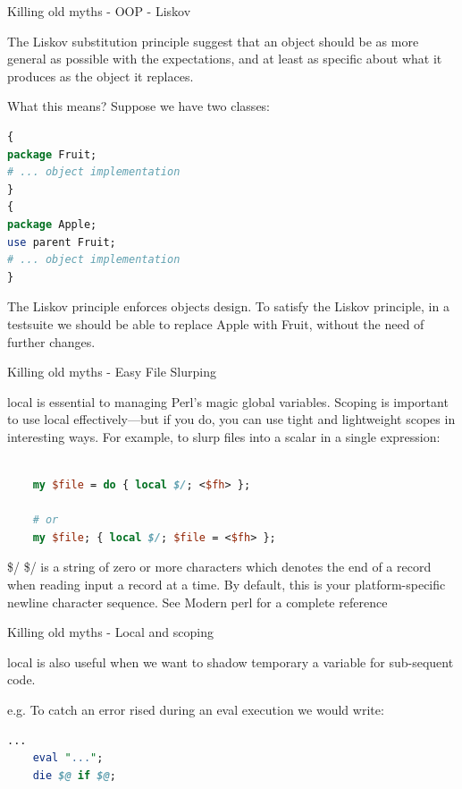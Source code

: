\documentclass[10pt]{beamer}
\begin{document}
\begin{frame}[fragile]{Killing old myths - OOP - Liskov}

The Liskov substitution principle suggest that an object should be as more general as possible with the expectations, and at least as specific about what it produces as the object it replaces.

What this means?
Suppose we have two classes:
\begin{lstlisting}[language=perl]
{
package Fruit;
# ... object implementation
}
{
package Apple;
use parent Fruit;
# ... object implementation
}
\end{lstlisting}
The Liskov principle enforces objects design. To satisfy the Liskov principle, in a testsuite we should be able to replace Apple with Fruit, without the need of further changes.

\end{frame}


\begin{frame}[fragile]{Killing old myths - Easy File Slurping}

local is essential to managing Perl's magic global variables. Scoping is important to use local effectively—but if you do, you can use tight and lightweight scopes in interesting ways. For example, to slurp files into a scalar in a single expression:
\begin{lstlisting}[language=perl]

    my $file = do { local $/; <$fh> };

    # or
    my $file; { local $/; $file = <$fh> };

    \end{lstlisting}

    \begin{alertblock}{\$/}
    \$/ is a string of zero or more characters which denotes the end of a record when reading input a record at a time. By default, this is your platform-specific newline character sequence. See Modern perl for a complete reference
    \end{alertblock}

\end{frame}

\begin{frame}[fragile]{Killing old myths - Local and scoping}

local is also useful when we want to shadow temporary a variable for sub-sequent code.

\pause
e.g. To catch an error rised during an eval execution we would write:

    \begin{lstlisting}[language=perl]
    ...
    eval "...";
    die $@ if $@;
    \end{lstlisting}

\end{frame}
\end{document}
